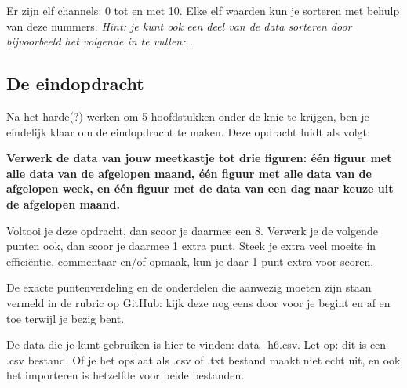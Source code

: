 \documentclass[a4paper,11pt, fleqn]{article}
\begin{document}
Er zijn elf channels: 0 tot en met 10. Elke elf waarden kun je sorteren met behulp van deze nummers. {\it Hint: je kunt ook een deel van de data sorteren door bijvoorbeeld het volgende in te vullen: .}

\subsection{De eindopdracht}
Na het harde(?) werken om 5 hoofdstukken onder de knie te krijgen, ben je eindelijk klaar om de eindopdracht te maken. Deze opdracht luidt als volgt: 

{\bf Verwerk de data van jouw meetkastje tot drie figuren: \'e\'en figuur met alle data van de afgelopen maand, \'e\'en figuur met alle data van de afgelopen week, en \'e\'en figuur met de data van een dag naar keuze uit de afgelopen maand.}

Voltooi je deze opdracht, dan scoor je daarmee een 8. Verwerk je de volgende punten ook, dan scoor je daarmee 1 extra punt. Steek je extra veel moeite in effici\"entie, commentaar en/of opmaak, kun je daar 1 punt extra voor scoren.

De exacte puntenverdeling en de onderdelen die aanwezig moeten zijn staan vermeld in de rubric op GitHub: kijk deze nog eens door voor je begint en af en toe terwijl je bezig bent.

De data die je kunt gebruiken is hier te vinden: \href{https://github.com/Ichthus-College-IN/Python-x-Meet-je-leefomgeving/tree/main/inc/data_h6.csv}{data\_h6.csv}. Let op: dit is een .csv bestand. Of je het opslaat als .csv of .txt bestand maakt niet echt uit, en ook het importeren is hetzelfde voor beide bestanden.
\end{document}
